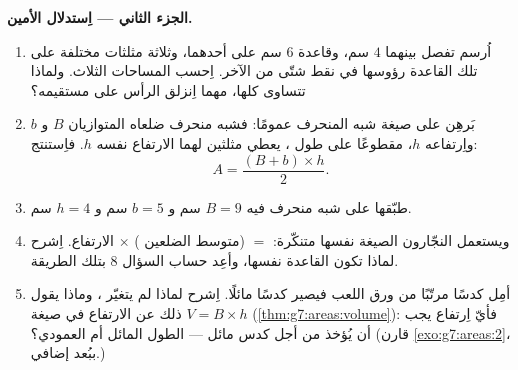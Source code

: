 \begin{problem}[{مسألة نهاية الأسبوع --- «برهان» مشهور على أن
$64 = 65$، تفضحه المساحات والميول، مع بيتزا وحلقات
للحلوى}]
\medskip
\noindent\textbf{الجزء الثاني --- اِستدلال  الأمين.}
\begin{enumerate}[resume]
  \item اُرسم   تفصل بينهما $4$ سم، وقاعدة $6$ سم على
        أحدهما، وثلاثة مثلثات مختلفة على تلك القاعدة
        رؤوسها في نقط شتّى من  الآخر. اِحسب
        المساحات الثلاث. ولماذا تتساوى كلها، مهما اِنزلق
        الرأس على مستقيمه؟
  \item بَرهِن على صيغة شبه المنحرف عمومًا: فشبه منحرف
        ضلعاه المتوازيان $B$ و $b$ واِرتفاعه $h$، مقطوعًا على طول
        ، يعطي مثلثين لهما الارتفاع نفسه $h$.
        فاِستنتج:
        \[
        A = \frac{(B + b) \times h}{2} .
        \]
  \item طبّقها على شبه منحرف فيه $B = 9$ سم و $b = 5$ سم
        و $h = 4$ سم.
  \item ويستعمل النجّارون الصيغة نفسها متنكّرة:  $=$
        (متوسط الضلعين ) $\times$ الارتفاع.
        اِشرح لماذا تكون القاعدة نفسها، وأعِد حساب
        السؤال 8 بتلك الطريقة.
  \item أمِل كدسًا مرتّبًا من ورق اللعب فيصير كدسًا مائلًا.
        اِشرح لماذا لم يتغيّر ، وماذا يقول ذلك
        عن الارتفاع في صيغة 
        $V = B \times h$ (\cref{thm:g7:areas:volume}): فأيّ
        اِرتفاع يجب أن يُؤخذ من أجل كدس مائل --- الطول المائل
        أم العمودي؟ (قارن
        \cref{exo:g7:areas:2}، ببُعد إضافي.)
\end{enumerate}


\end{problem}
